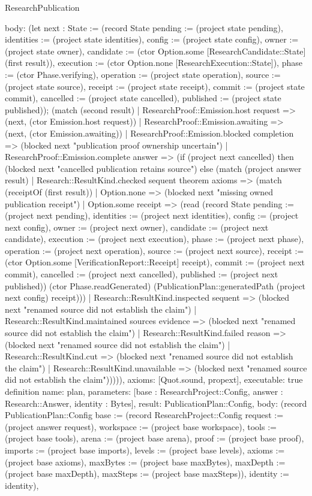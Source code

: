 \begin{lexlean}{ResearchPublication}
\begin{semanticmodule}
{ body: (let next : State := (record State {pending := (project state pending), identities := (project state identities), config := (project state config), owner := (project state owner), candidate := (ctor Option.some [ResearchCandidate::State] (first result)), execution := (ctor Option.none [ResearchExecution::State]), phase := (ctor Phase.verifying), operation := (project state operation), source := (project state source), receipt := (project state receipt), commit := (project state commit), cancelled := (project state cancelled), published := (project state published)}); (match (second result) | ResearchProof::Emission.host request => (next, (ctor Emission.host request)) | ResearchProof::Emission.awaiting => (next, (ctor Emission.awaiting)) | ResearchProof::Emission.blocked completion => (blocked next "publication proof ownership uncertain") | ResearchProof::Emission.complete answer => (if (project next cancelled) then (blocked next "cancelled publication retains source") else (match (project answer result) | Research::ResultKind.checked sequent theorem axioms => (match (receiptOf (first result)) | Option.none => (blocked next "missing owned publication receipt") | Option.some receipt => (read (record State {pending := (project next pending), identities := (project next identities), config := (project next config), owner := (project next owner), candidate := (project next candidate), execution := (project next execution), phase := (project next phase), operation := (project next operation), source := (project next source), receipt := (ctor Option.some [VerificationReport::Receipt] receipt), commit := (project next commit), cancelled := (project next cancelled), published := (project next published)}) (ctor Phase.readGenerated) (PublicationPlan::generatedPath (project next config) receipt))) | Research::ResultKind.inspected sequent => (blocked next "renamed source did not establish the claim") | Research::ResultKind.maintained sources evidence => (blocked next "renamed source did not establish the claim") | Research::ResultKind.failed reason => (blocked next "renamed source did not establish the claim") | Research::ResultKind.cut => (blocked next "renamed source did not establish the claim") | Research::ResultKind.unavailable => (blocked next "renamed source did not establish the claim"))))),
 axioms: [Quot.sound, propext],
 executable: true
}
definition{
 name: plan,
 parameters: [base : ResearchProject::Config, answer : Research::Answer, identity : Bytes],
 result: PublicationPlan::Config,
 body: (record PublicationPlan::Config {base := (record ResearchProject::Config {request := (project answer request), workspace := (project base workspace), tools := (project base tools), arena := (project base arena), proof := (project base proof), imports := (project base imports), levels := (project base levels), axioms := (project base axioms), maxBytes := (project base maxBytes), maxDepth := (project base maxDepth), maxSteps := (project base maxSteps)}), identity := identity}),
}
\end{semanticmodule}
\end{lexlean}
